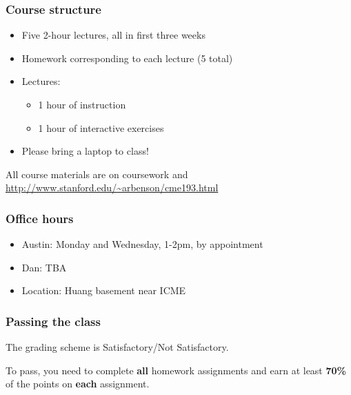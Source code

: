 \documentclass{beamer}
\begin{document}
\begin{frame}
\frametitle{Course structure}

\begin{itemize}
\setlength{\itemsep}{0.2in}
\item{
Five 2-hour lectures, all in first three weeks
}

\item{
Homework corresponding to each lecture (5 total)
}

\item{
Lectures:
\begin{itemize}
\setlength{\itemsep}{0.05in}
\item{1 hour of instruction}
\item{1 hour of interactive exercises}
\end{itemize}
}

\item{
Please bring a laptop to class!
}
\end{itemize}

\vspace{0.2in}

All course materials are on coursework and \url{http://www.stanford.edu/~arbenson/cme193.html}

\end{frame}

\begin{frame}
\frametitle{Office hours}

\begin{itemize}
\setlength{\itemsep}{0.2in}
\item{Austin: Monday and Wednesday, 1-2pm, by appointment}
\item{Dan: TBA}
\item{Location: Huang basement near ICME}
\end{itemize}

\end{frame}


\begin{frame}
\frametitle{Passing the class}

The grading scheme is Satisfactory/Not Satisfactory.

\vspace{0.2in}

To pass, you need to complete \textbf{all} homework assignments and earn at least \textbf{70\%} of the points on \textbf{each} assignment.

\end{frame}
\end{document}
